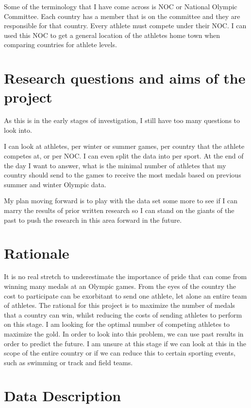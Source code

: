 \documentclass[
]{article}
\begin{document}
Some of the terminology that I have come across is NOC or National Olympic Committee. Each country has a member that is on the committee and they are responsible for that country. Every athlete must compete under their NOC. I can used this NOC to get a general location of the athletes home town when comparing countries for athlete levels.

\section{Research questions and aims of the project}\label{research-questions-and-aims-of-the-project}

As this is in the early stages of investigation, I still have too many questions to look into.

I can look at athletes, per winter or summer games, per country that the athlete competes at, or per NOC. I can even split the data into per sport. At the end of the day I want to answer, what is the minimal number of athletes that my country should send to the games to receive the most medals based on previous summer and winter Olympic data.

My plan moving forward is to play with the data set some more to see if I can marry the results of prior written research so I can stand on the giants of the past to push the research in this area forward in the future.

\section{Rationale}\label{rationale}

It is no real stretch to underestimate the importance of pride that can come from winning many medals at an Olympic games. From the eyes of the country the cost to participate can be exorbitant to send one athlete, let alone an entire team of athletes. The rational for this project is to maximize the number of medals that a country can win, whilst reducing the costs of sending athletes to perform on this stage. I am looking for the optimal number of competing athletes to maximize the gold. In order to look into this problem, we can use past results in order to predict the future.
I am unsure at this stage if we can look at this in the scope of the entire country or if we can reduce this to certain sporting events, such as swimming or track and field teams.

\section{Data Description}\label{data-description}
\end{document}
